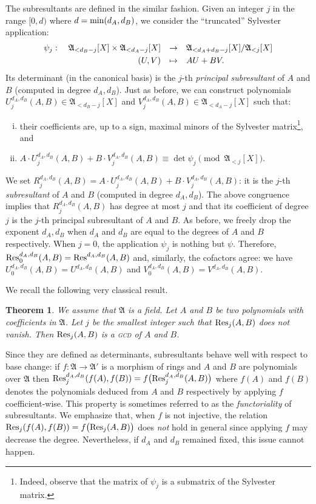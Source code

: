 \documentclass{jT}
\numberwithin{equation}{section}
\newtheorem{theo}{Theorem}[section]
\theoremstyle{definition}
\renewcommand{\min}{\text{\rm min}}
\newcommand{\ring}{\mathfrak A}
\renewcommand{\Res}{\text{\rm Res}}
\begin{document}
The subresultants are defined in the similar fashion. Given an
integer $j$ in the range $[0, d)$ where $d = \min(d_A, d_B)$, we
consider the ``truncated'' Sylvester application:
$$\begin{array}{rcl}
\psi_j : \quad
\ring_{< d_B-j}[X] \times \ring_{< d_A-j}[X] & \to &
\ring_{< d_A+d_B-j}[X]/\ring_{< j}[X] \smallskip \\
(U,V) & \mapsto & AU + BV.
\end{array}$$
Its determinant (in the canonical basis) is the $j$-th \emph{principal 
subresultant} of $A$ and $B$ (computed in degree $d_A, d_B$). Just 
as before, we can construct polynomials $U_j^{d_A, d_B}(A,B) \in
\ring_{< d_B-j}[X]$ and $V_j^{d_A, d_B}(A,B) \in \ring_{< d_A-j}[X]$
such that:
\begin{enumerate}[i)]
\item their coefficients are, up to a sign, maximal minors of the 
Sylvester matrix\footnote{Indeed, observe that the matrix of $\psi_j$ is a
submatrix of the Sylvester matrix.}, and
\item $A \cdot U_j^{d_A, d_B}(A,B) + B \cdot V_j^{d_A, d_B}(A,B) 
\equiv \det \psi_j \pmod {\ring_{< j}[X]}$.
\end{enumerate}
We set $R_j^{d_A, d_B}(A,B) = A \cdot U_j^{d_A, d_B}(A,B) + B \cdot 
V_j^{d_A, d_B}(A,B)$: it is the $j$-th \emph{subresultant} of $A$
and $B$ (computed in degree $d_A, d_B$). The above congruence implies
that $R_j^{d_A, d_B}(A,B)$ has degree at most $j$ and that its
coefficient of degree $j$ is the $j$-th principal subresultant of $A$
and $B$. As before, we freely drop the exponent $d_A, d_B$ when
$d_A$ and $d_B$ are equal to the degrees of $A$ and $B$ respectively.
When $j=0$, the application $\psi_j$ is nothing but $\psi$. Therefore,
$\Res_0^{d_A, d_B}(A,B) = \Res^{d_A, d_B}(A,B)$ and, similarly, the
cofactors agree: we have $U_0^{d_A, d_B}(A,B) = U^{d_A, d_B}(A,B)$
and $V_0^{d_A, d_B}(A,B) = V^{d_A, d_B}(A,B)$.

We recall the following very classical result.

\begin{theo}
We assume that $\ring$ is a field. Let $A$ and $B$ be two polynomials
with coefficients in $\ring$. Let $j$ be the smallest integer such
that $\Res_j(A,B)$ does not vanish. Then $\Res_j(A,B)$ is a \textsc{gcd}
of $A$ and $B$.
\end{theo}

Since they are defined as determinants, subresultants behave well with 
respect to base change: if $f : \ring \to \ring'$ is a morphism of rings 
and $A$ and $B$ are polynomials over $\ring$ then $\Res_j^{d_A,d_B} 
(f(A),f(B)) = f\big(\Res_j^{d_A,d_B}(A,B)\big)$ where $f(A)$ and $f(B)$ 
denotes the polynomials deduced from $A$ and $B$ respectively by 
applying $f$ coefficient-wise. This property is sometimes referred to as 
the \emph{functoriality} of subresultants.
We emphasize that, when $f$ is not injective, the relation 
$\Res_j(f(A),f(B)) = f\big(\Res_j(A,B)\big)$ does \emph{not} hold in 
general since applying $f$ may decrease the degree. Nevertheless, if
$d_A$ and $d_B$ remained fixed, this issue cannot happen.
\end{document}
